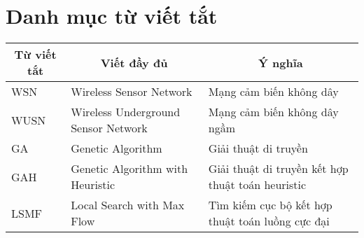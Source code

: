 \chapter*{Danh mục từ viết tắt}

\begin{table}[H]
    \begin{tabularx}{\linewidth}{|l|X|X|}
    \hline
    \multicolumn{1}{|c|}{\textbf{Từ viết tắt}} & \multicolumn{1}{c|}{\textbf{Viết đầy đủ}} & \multicolumn{1}{c|}{\textbf{Ý nghĩa}}             \\ \hline
    WSN                                       & Wireless Sensor Network       & Mạng cảm biến không dây                                        \\ \hline
    WUSN                                       & Wireless Underground Sensor Network       & Mạng cảm biến không dây ngầm                      \\ \hline
    GA                                         & Genetic Algorithm                         & Giải thuật di truyền                              \\ \hline
    GAH                                        & Genetic Algorithm with Heuristic          & Giải thuật di truyền kết hợp thuật toán heuristic \\ \hline
    LSMF                                       & Local Search with Max Flow                & Tìm kiếm cục bộ kết hợp thuật toán luồng cực đại  \\ \hline
    \end{tabularx}
\end{table}
